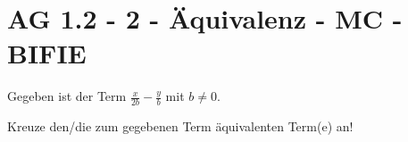 \section{AG 1.2 - 2 - Äquivalenz - MC - BIFIE}

\begin{beispiel}[AG 1.2]{1} %
Gegeben ist der Term $\frac{x}{2b}-\frac{y}{b}$ mit $b\neq 0$.
			
			Kreuze den/die zum gegebenen Term äquivalenten Term(e) an!
\end{beispiel}